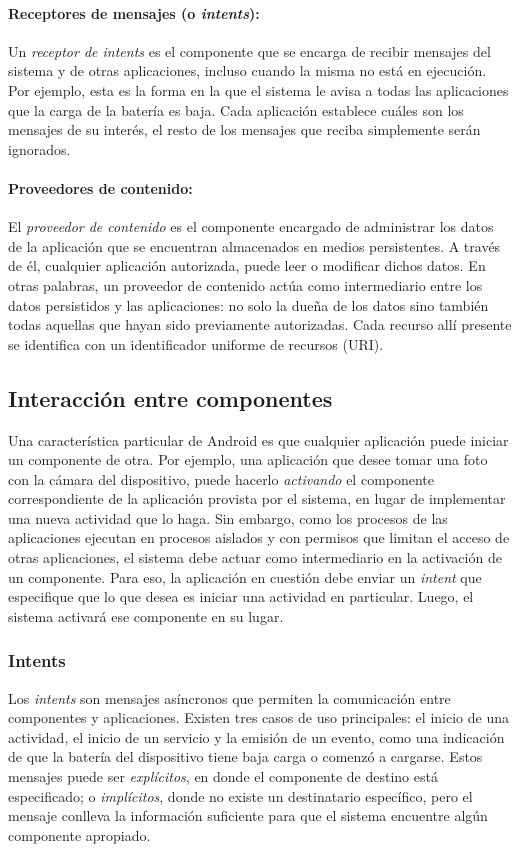 \paragraph{Receptores de mensajes (o \textit{intents}): }
Un \textit{receptor de intents} es el componente que se encarga de recibir mensajes del sistema y de
otras aplicaciones, incluso cuando la misma no está en ejecución. Por ejemplo, esta es la forma en la
que el sistema le avisa a todas las aplicaciones que la carga de la batería es baja. Cada aplicación
establece cuáles son los mensajes de su interés, el resto de los mensajes que reciba simplemente serán
ignorados.

\paragraph{Proveedores de contenido:}
El \textit{proveedor de contenido} es el componente encargado de administrar los datos de la
aplicación que se encuentran almacenados en medios persistentes. A través de él, cualquier aplicación
autorizada, puede leer o modificar dichos datos. En otras palabras, un proveedor de contenido actúa
como intermediario entre los datos persistidos y las aplicaciones: no solo la dueña de los datos sino
también todas aquellas que hayan sido previamente autorizadas. Cada recurso allí presente se
identifica con un identificador uniforme de recursos (URI).

\subsection{Interacción entre componentes}
Una característica particular de Android es que cualquier aplicación puede iniciar un componente de
otra. Por ejemplo, una aplicación que desee tomar una foto con la cámara del dispositivo, puede
hacerlo \textit{activando} el componente correspondiente de la aplicación provista por el sistema, en
lugar de implementar una nueva actividad que lo haga. Sin embargo, como los procesos de las
aplicaciones ejecutan en procesos aislados y con permisos que limitan el acceso de otras aplicaciones,
el sistema debe actuar como intermediario en la activación de un componente. Para eso, la aplicación
en cuestión debe enviar un \textit{intent} que especifique que lo que desea es iniciar una actividad
en particular. Luego, el sistema activará ese componente en su lugar.

\subsubsection*{Intents}
Los \textit{intents} son mensajes asíncronos que permiten la comunicación entre componentes y
aplicaciones. Existen tres casos de uso principales: el inicio de una actividad, el inicio de un
servicio y la emisión de un evento, como una indicación de que la batería del dispositivo tiene baja
carga o comenzó a cargarse. Estos mensajes puede ser \textit{explícitos}, en donde el componente de
destino está especificado; o \textit{implícitos}, donde no existe un destinatario específico, pero el
mensaje conlleva la información suficiente para que el sistema encuentre algún componente apropiado.


